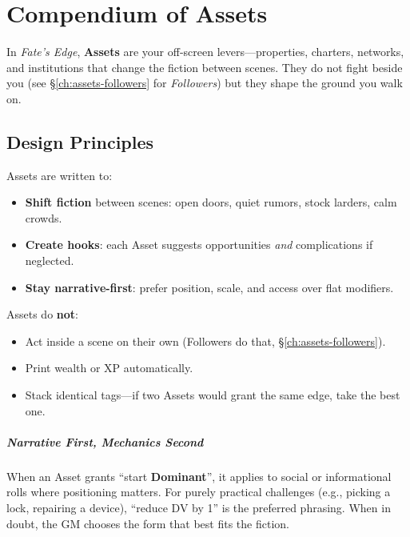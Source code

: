 \chapter{Compendium of Assets}
\label{ch:compendium-assets}

In \textit{Fate's Edge}, \textbf{Assets} are your off-screen levers—properties, charters, networks, and institutions that change the fiction between scenes. They do not fight beside you (see \S\ref{ch:assets-followers} for \emph{Followers}) but they shape the ground you walk on.

\section{Design Principles}
Assets are written to:
\begin{itemize}
  \item \textbf{Shift fiction} between scenes: open doors, quiet rumors, stock larders, calm crowds.
  \item \textbf{Create hooks}: each Asset suggests opportunities \emph{and} complications if neglected.
  \item \textbf{Stay narrative-first}: prefer position, scale, and access over flat modifiers.
\end{itemize}

Assets do \textbf{not}:
\begin{itemize}
  \item Act inside a scene on their own (Followers do that, \S\ref{ch:assets-followers}). 
  \item Print wealth or XP automatically.
  \item Stack identical tags—if two Assets would grant the same edge, take the best one. 
\end{itemize}

\paragraph{Narrative First, Mechanics Second}
When an Asset grants “start \textbf{Dominant}”, it applies to social or informational rolls where positioning matters. For purely practical challenges (e.g., picking a lock, repairing a device), “reduce DV by 1” is the preferred phrasing. When in doubt, the GM chooses the form that best fits the fiction.

